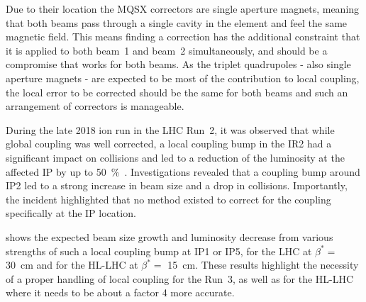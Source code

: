 Due to their location the MQSX correctors are single aperture magnets, meaning that both beams pass through a single cavity in the element and feel the same magnetic field.
This means finding a correction has the additional constraint that it is applied to both beam~\num{1} and beam~\num{2} simultaneously, and should be a compromise that works for both beams.
As the triplet quadrupoles - also single aperture magnets - are expected to be most of the contribution to local coupling, the local error to be corrected should be the same for both beams and such an arrangement of correctors is manageable.

During the late \num{2018} ion run in the LHC Run~\num{2}, it was observed that while global coupling was well corrected, a local coupling bump in the IR\num{2} had a significant impact on collisions and led to a reduction of the luminosity at the affected IP by up to \qty{50}{\percent}~\cite{IPAC:Jowett:LHC_2018_Heavy_Ion_Run, IPAC:Tomas:Run2_Experience_View_LHC_HLLHC, CERN:Persson:LHCOpticsCorrectionsEvian2019}.
Investigations revealed that a coupling bump around IP\num{2} led to a strong increase in beam size and a drop in collisions.
Importantly, the incident highlighted that no method existed to correct for the coupling specifically at the IP location.

 shows the expected beam size growth and luminosity decrease from various strengths of such a local coupling bump at IP\num{1} or IP\num{5}, for the LHC at \(\beta^{*}=\) \qty{30}{\centi\meter} and for the HL-LHC at \(\beta^{*}=\) \qty{15}{\centi\meter}.
These results highlight the necessity of a proper handling of local coupling for the Run~\num{3}, as well as for the HL-LHC where it needs to be about a factor \num{4} more accurate.

